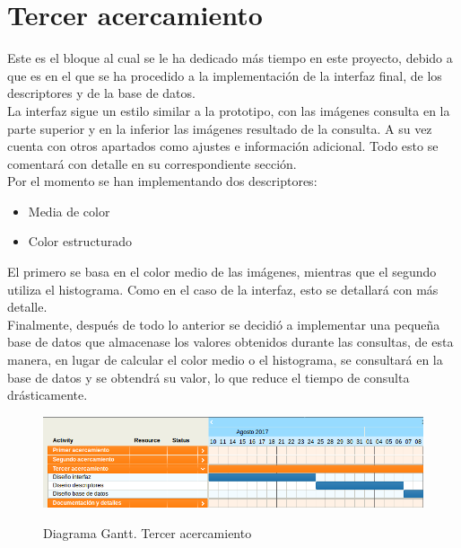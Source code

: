 \section{Tercer acercamiento}

Este es el bloque al cual se le ha dedicado más tiempo en este proyecto, debido a que es en el que se ha procedido a la implementación de la interfaz final, de los descriptores y de la base de datos.\\

La interfaz sigue un estilo similar a la prototipo, con las imágenes consulta en la parte superior y en la inferior las imágenes resultado de la consulta. A su vez cuenta con otros apartados como ajustes e información adicional. Todo esto se comentará con detalle en su correspondiente sección.\\

Por el momento se han implementando dos descriptores:
\begin{itemize}
\item Media de color
\item Color estructurado
\end{itemize}

El primero se basa en el color medio de las imágenes, mientras que el segundo utiliza el histograma. Como en el caso de la interfaz, esto se detallará con más detalle.\\

Finalmente, después de todo lo anterior se decidió a implementar una pequeña base de datos que almacenase los valores obtenidos durante las consultas, de esta manera, en lugar de calcular el color medio o el histograma, se consultará en la base de datos y se obtendrá su valor, lo que reduce el tiempo de consulta drásticamente.\\

\begin{figure}[H] %
\centering
\includegraphics[scale=0.5]{imagenes/gant3.png}  %
\label{gant3.png}
\caption{Diagrama Gantt. Tercer acercamiento}
\end{figure}


